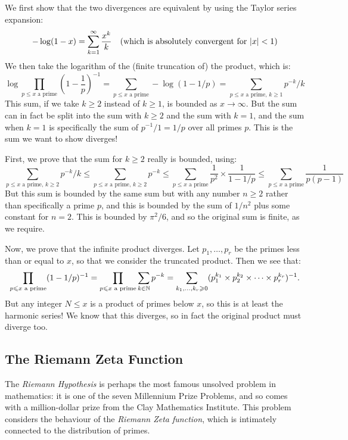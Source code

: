 \documentclass{article}
\begin{document}
\begin{prf}
    We first show that the two divergences are equivalent by using the Taylor series expansion:
    \[
	- \log(1-x) = \sum_{k = 1}^\infty \frac{x^k}{k}
	\quad \text{(which is absolutely convergent for $\left\lvert x \right\rvert < 1$)}
	\]
	We then take the logarithm of the (finite truncation of) the product, which is:
	\[
	\log
	\prod_{p \leq x \text{ a prime}}
	\left( 1 - \frac{1}{p} \right)^{-1}
	= \sum_{p \leq x \text{ a prime}}
	- \log(1-1/p)
	= \sum_{p \leq x \text{ a prime}, \, k \geq 1}
	p^{-k}/k
	\]
	This sum, if we take $k \geq 2$ instead of $k \geq 1$, is bounded as $x \to \infty$.
	But the sum can in fact be split into the sum with $k \geq 2$ and the sum with $k = 1$, and the sum when $k = 1$ is specifically the sum of $p^{-1}/1 = 1/p$ over all primes $p$.
	This is the sum we want to show diverges!
	
	First, we prove that the sum for $k \geq 2$ really is bounded, using:
	\[
	\sum_{p \leq x \text{ a prime}, \, k \geq 2} p^{-k}/k \leq
	\sum_{p \leq x \text{ a prime}, \, k \geq 2} p^{-k} \leq
	\sum_{p \leq x \text{ a prime}} \frac{1}{p^2} \times \frac{1}{1-1/p} \leq
	\sum_{p \leq x \text{ a prime}} \frac{1}{p(p-1)}
	\]
	But this sum is bounded by the same sum but with any number $n \geq 2$ rather than specifically a prime $p$, and this is bounded by the sum of $1/n^2$ plus some constant for $n=2$.
	This is bounded by $\pi^2/6$, and so the original sum is finite, as we require.
	
	Now, we prove that the infinite product diverges. Let $p_1, \dots, p_r$ be the primes less than or equal to $x$, so that we consider the truncated product. Then we see that:
	\[
	\prod_{p \leqslant x \text{ a prime}} (1 - 1/p)^{-1} =
	\prod_{p \leqslant x \text{ a prime}} \sum_{k \in \mathbb{N}} p^{-k} =
	\sum_{k_1, \dots, k_r \geqslant 0} (p_1^{k_1} \times p_2^{k_2} \times \dots \times p_r^{k_r})^{-1}.
	\]
	But any integer $N \leq x$ is a product of primes below $x$, so this is at least the harmonic series! We know that this diverges, so in fact the original product must diverge too.
\end{prf}


\subsection{The Riemann Zeta Function}
\label{subsection-distribution-of-primes-riemann-zeta}

The \textit{Riemann Hypothesis} is perhaps the most famous unsolved problem in mathematics: it is one of the seven Millennium Prize Problems, and so comes with a million-dollar prize from the Clay Mathematics Institute. This problem considers the behaviour of the \textit{Riemann Zeta function}, which is intimately connected to the distribution of primes.
\end{document}
